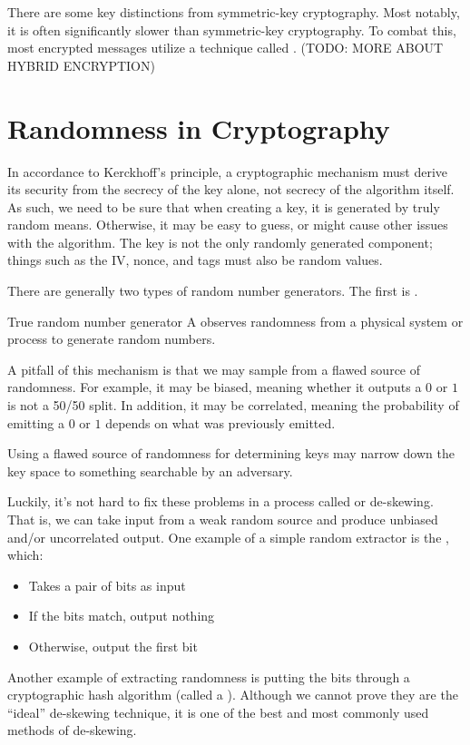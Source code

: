 There are some key distinctions from symmetric-key cryptography. Most notably, it is often significantly slower than symmetric-key cryptography. To combat this, most encrypted messages utilize a technique called . (TODO: MORE ABOUT HYBRID ENCRYPTION)

\section{Randomness in Cryptography}
In accordance to Kerckhoff's principle, a cryptographic mechanism must derive its security from the secrecy of the key alone, not secrecy of the algorithm itself. As such, we need to be sure that when creating a key, it is generated by truly random means. Otherwise, it may be easy to guess, or might cause other issues with the algorithm. The key is not the only randomly generated component; things such as the IV, nonce, and tags must also be random values.

There are generally two types of random number generators. The first is .

\begin{dfnbox}{True random number generator}{}
    A  observes randomness from a physical system or process to generate random numbers.
\end{dfnbox}

A pitfall of this mechanism is that we may sample from a flawed source of randomness. For example, it may be biased, meaning whether it outputs a $0$ or $1$ is not a 50/50 split. In addition, it may be correlated, meaning the probability of emitting a $0$ or $1$ depends on what was previously emitted.

\begin{notebox}
    Using a flawed source of randomness for determining keys may narrow down the key space to something searchable by an adversary.
\end{notebox}

Luckily, it's not hard to fix these problems in a process called  or de-skewing. That is, we can take input from a weak random source and produce unbiased and/or uncorrelated output. One example of a simple random extractor is the , which:
\begin{itemize}
    \item Takes a pair of bits as input
    \item If the bits match, output nothing
    \item Otherwise, output the first bit
\end{itemize}
Another example of extracting randomness is putting the bits through a cryptographic hash algorithm (called a ). Although we cannot prove they are the ``ideal'' de-skewing technique, it is one of the best and most commonly used methods of de-skewing.


